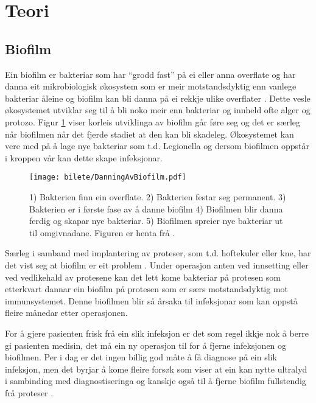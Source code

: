 \section{Teori}
\subsection{Biofilm}
Ein biofilm er bakteriar som har ``grodd fast'' på ei eller anna overflate og har danna eit mikrobiologisk økosystem som er meir motstandsdyktig enn vanlege bakteriar åleine og biofilm kan bli danna på ei rekkje ulike overflater \cite{biofilm}\cite{biofilm2}. Dette vesle økosystemet utviklar seg til å bli noko meir enn bakteriar og innheld ofte alger og protozo. Figur \ref{fig:biofilm} viser korleis utviklinga av biofilm går føre seg og det er særleg når biofilmen når det fjerde stadiet at den kan bli skadeleg. Økosystemet kan vere med på å lage nye bakteriar som t.d. Legionella \cite{biofilm} og dersom biofilmen oppstår i kroppen vår kan dette skape infeksjonar.

\begin{figure}[htbp]
	\centering
	\texttt{[image: bilete/DanningAvBiofilm.pdf]}
  	\caption[Dei fem fasene i biofilmdanning]{1) Bakterien finn ein overflate. 2) Bakterien festar seg permanent. 3) Bakterien er i første fase av å danne biofilm 	4) Biofilmen blir danna ferdig og skapar nye bakteriar. 5) Biofilmen spreier nye bakteriar ut til omgivnadane. Figuren er henta frå \cite{biofilmfigur}.}
  	\label{fig:biofilm}
\end{figure}

Særleg i samband med implantering av proteser, som t.d. hoftekuler eller kne, har det vist seg at biofilm er eit problem \cite{ultraprotese}. Under operasjon anten ved innsetting eller ved vedlikehald av protesene kan det lett kome bakteriar på protesen som etterkvart dannar ein biofilm på protesen som er særs motstandsdyktig mot immunsystemet. Denne biofilmen blir så årsaka til infeksjonar som kan oppstå fleire månedar etter operasjonen. 

For å gjere pasienten frisk frå ein slik infeksjon er det som regel ikkje nok å berre gi pasienten medisin, det må ein ny operasjon til for å fjerne infeksjonen og biofilmen\cite{infection}. Per i dag er det ingen billig god måte å få diagnose på ein slik infeksjon, men det byrjar å kome fleire forsøk som viser at ein kan nytte ultralyd i sambinding med diagnostiseringa og kanskje også til å fjerne biofilm fullstendig frå proteser \cite{ultraprotese}.

